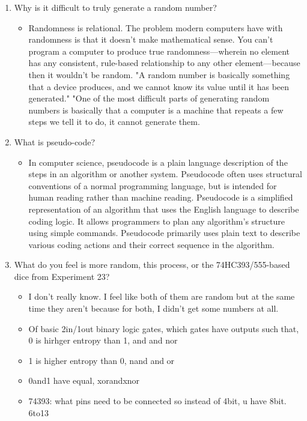 \documentclass[pstricks,border=11pt]{article}
\begin{document}
\begin{enumerate}
    \item Why is it difficult to truly generate a random number?
    \begin{itemize}
        \item Randomness is relational. The problem modern computers have with randomness is that it doesn't make mathematical sense. You can't program a computer to produce true randomness—wherein no element has any consistent, rule-based relationship to any other element—because then it wouldn't be random. "A random number is basically something that a device produces, and we cannot know its value until it has been generated." "One of the most difficult parts of generating random numbers is basically that a computer is a machine that repeats a few steps we tell it to do, it cannot generate them.
    \end{itemize}
    \item What is pseudo-code?
    \begin{itemize}
        \item In computer science, pseudocode is a plain language description of the steps in an algorithm or another system. Pseudocode often uses structural conventions of a normal programming language, but is intended for human reading rather than machine reading. Pseudocode is a simplified representation of an algorithm that uses the English language to describe coding logic. It allows programmers to plan any algorithm's structure using simple commands. Pseudocode primarily uses plain text to describe various coding actions and their correct sequence in the algorithm.
    \end{itemize}
    \item What do you feel is more random, this process, or the 74HC393/555-based dice from Experiment 23?
    \begin{itemize}
        \item I don't really know. I feel like both of them are random but at the same time they aren't because for both, I didn't get some numbers at all.
        \item Of basic 2in/1out binary logic gates, which gates have outputs such that, 0 is hirhger entropy than 1, and and nor
        \item 1 is higher entropy than 0, nand and or
        \item 0and1 have equal, xorandxnor
        \item 74393: what pins need to be connected so instead of 4bit, u have 8bit. 6to13

\end{itemize}
\end{enumerate}
\end{document}
